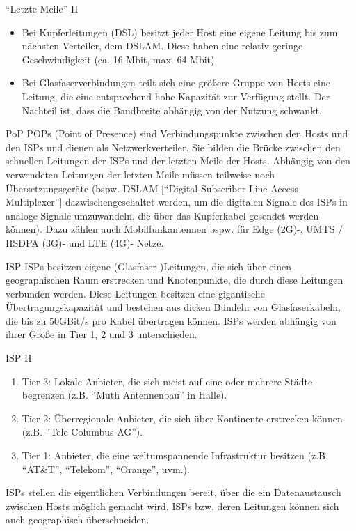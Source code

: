 \documentclass[utf8]{beamer}
\begin{document}
	\begin{frame}{\enquote{Letzte Meile} II}
		\begin{itemize}
			\item{Bei Kupferleitungen (DSL) besitzt jeder Host eine eigene Leitung bis zum nächsten Verteiler, dem DSLAM. Diese haben eine relativ geringe Geschwindigkeit (ca. 16 Mbit, max. 64 Mbit).}
			\item{Bei Glasfaserverbindungen teilt sich eine größere Gruppe von Hosts eine Leitung, die eine entsprechend hohe Kapazität zur Verfügung stellt. Der Nachteil ist, dass die Bandbreite abhängig von der Nutzung schwankt.}
		\end{itemize}
	\end{frame}
	
	\begin{frame}{PoP}
		POPs (Point of Presence) sind Verbindungspunkte zwischen den Hosts und den ISPs und dienen als Netzwerkverteiler. Sie bilden die Brücke zwischen den schnellen Leitungen der ISPs und der letzten Meile der Hosts. Abhängig von den verwendeten Leitungen der letzten Meile müssen teilweise noch Übersetzungsgeräte (bspw. DSLAM [\enquote{Digital Subscriber Line Access Multiplexer}] dazwischengeschaltet werden, um die digitalen Signale des ISPs in analoge Signale umzuwandeln, die über das Kupferkabel gesendet werden können).
		Dazu zählen auch Mobilfunkantennen bspw. für Edge (2G)-, UMTS / HSDPA (3G)- und LTE (4G)- Netze.
	\end{frame}
	
	\begin{frame}{ISP}
		ISPs besitzen eigene (Glasfaser-)Leitungen, die sich über einen geographischen Raum erstrecken und Knotenpunkte, die durch diese Leitungen verbunden werden. Diese Leitungen besitzen eine gigantische Übertragungskapazität und bestehen aus dicken Bündeln von Glasfaserkabeln, die bis zu 50GBit/s pro Kabel übertragen können.
		ISPs werden abhängig von ihrer Größe in Tier 1, 2 und 3 unterschieden.
	\end{frame}

	\begin{frame}{ISP II}
		\begin{enumerate}
			\item{Tier 3: Lokale Anbieter, die sich meist auf eine oder mehrere Städte begrenzen (z.B. \enquote{Muth Antennenbau} in Halle).}
			\item{Tier 2: Überregionale Anbieter, die sich über Kontinente erstrecken können (z.B. \enquote{Tele Columbus AG}).} 
			\item{Tier 1: Anbieter, die eine weltumspannende Infrastruktur besitzen (z.B. \enquote{AT\&T}, \enquote{Telekom}, \enquote{Orange}, uvm.).}
		\end{enumerate}
		
		ISPs stellen die eigentlichen Verbindungen bereit, über die ein Datenaustausch zwischen Hosts möglich gemacht wird. ISPs bzw. deren Leitungen können sich auch geographisch überschneiden.
	\end{frame}
	
\end{document}

